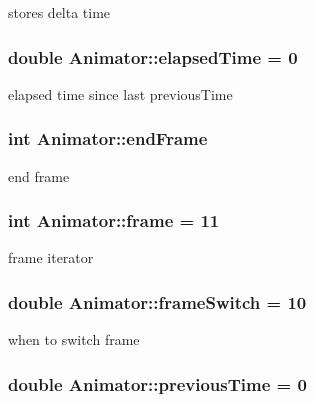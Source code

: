 stores delta time 

\hypertarget{class_animator_ad4e7ef21255ce54402021eca4d70b203}{}
\subsubsection[{elapsed\+Time}]{\setlength{\rightskip}{0pt plus 5cm}double Animator\+::elapsed\+Time = 0}\label{class_animator_ad4e7ef21255ce54402021eca4d70b203}


elapsed time since last previous\+Time 

\hypertarget{class_animator_abf1ea9056b2175f2a73be4d3db5cdee0}{}
\subsubsection[{end\+Frame}]{\setlength{\rightskip}{0pt plus 5cm}int Animator\+::end\+Frame}\label{class_animator_abf1ea9056b2175f2a73be4d3db5cdee0}


end frame 

\hypertarget{class_animator_a83bd24135d81ef8cfd5b2dfcc405d003}{}
\subsubsection[{frame}]{\setlength{\rightskip}{0pt plus 5cm}int Animator\+::frame = 11}\label{class_animator_a83bd24135d81ef8cfd5b2dfcc405d003}


frame iterator 

\hypertarget{class_animator_a955f8216878caa737846d23d8cc86ecb}{}
\subsubsection[{frame\+Switch}]{\setlength{\rightskip}{0pt plus 5cm}double Animator\+::frame\+Switch = 10}\label{class_animator_a955f8216878caa737846d23d8cc86ecb}


when to switch frame 

\hypertarget{class_animator_a65c0a630e6da7004a0cbb6d92eee7238}{}
\subsubsection[{previous\+Time}]{\setlength{\rightskip}{0pt plus 5cm}double Animator\+::previous\+Time = 0}\label{class_animator_a65c0a630e6da7004a0cbb6d92eee7238}


